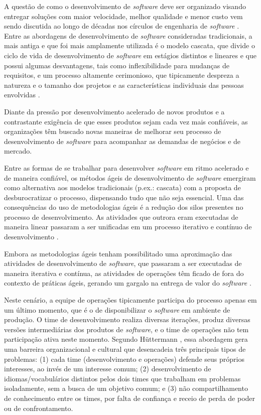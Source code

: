 A questão de como o desenvolvimento de \textit{software} deve ser
organizado visando entregar soluções com maior velocidade, melhor qualidade e
menor custo vem sendo discutida ao longo de décadas nos círculos de engenharia
de \textit{software} \cite{empirical_studies_agile}. Entre as abordagens de
desenvolvimento de \textit{software} consideradas tradicionais, a mais antiga e
que foi mais amplamente utilizada é o modelo cascata, que divide o ciclo de
vida de desenvolvimento de \textit{software} em estágios distintos e lineares
e que possui algumas desvantagens, tais como inflexibilidade para
mudanças de requisitos, e um processo altamente cerimonioso, que tipicamente
despreza a natureza e o tamanho dos projetos e as características individuais
das pessoas envolvidas \cite{software_quality_agile}.

Diante da pressão por desenvolvimento acelerado de novos produtos e a
contrastante exigência de que esses produtos sejam cada vez mais confiáveis,
as organizações têm buscado novas maneiras de melhorar seu processo de
desenvolvimento de \textit{software} para acompanhar as demandas de negócios e
de mercado.

Entre as formas de se trabalhar para desenvolver \textit{software} em ritmo
acelerado e de maneira confiável, os métodos ágeis de desenvolvimento de
\textit{software} emergiram como alternativa aos modelos tradicionais
(p.ex.: cascata) com a proposta de desburocratizar o processo, dispensando tudo
que não seja essencial. Uma das consequências do uso de metodologias ágeis é a
redução dos silos presentes no processo de desenvolvimento. As atividades que
outrora eram executadas de maneira linear passaram a ser unificadas em um
processo iterativo e contínuo de desenvolvimento \cite{a_decade_of_agile}.

Embora as metodologias ágeis tenham possibilitado uma aproximação das
atividades de desenvolvimento de \textit{software}, que passaram a ser
executadas de maneira iterativa e contínua, as atividades de operações têm
ficado de fora do contexto de práticas ágeis, gerando um gargalo na entrega
de valor do \textit{software} \cite{understanding_devops}.

Neste cenário, a equipe de operações tipicamente participa do processo
apenas em um último momento, que é o de disponibilizar o
\textit{software} em ambiente de produção. O time de desenvolvimento realiza
diversas iterações, produz diversas versões intermediárias dos produtos de
\textit{software}, e o time de operações não tem participação ativa neste
momento. Segundo H\"uttermann
\cite{devops_for_developers}, essa abordagem gera uma barreira organizacional
e cultural que desencadeia três principais tipos de problemas: (1) cada time
(desenvolvimento e operações) defende seus próprios interesses, ao invés de
um interesse comum; (2) desenvolvimento de idiomas/vocabulários distintos pelos
dois times que trabalham em problemas isoladamente, sem a busca de um objetivo
comum; e (3) não compartilhamento de conhecimento entre os times, por falta
de confiança e receio de perda de poder ou de confrontamento.

